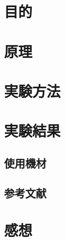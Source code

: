 \documentclass{jlreq}
\numberwithin{equation}{section}
\begin{document}
\section{目的}

\section{原理}

\section{実験方法}

\section{実験結果}

\subsection{使用機材}

\subsection{参考文献}

\section{感想}
\end{document}
